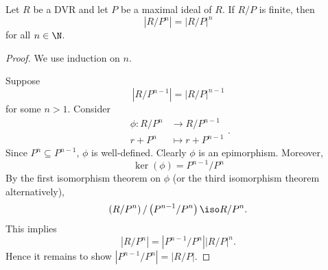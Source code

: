 \documentclass[pmath441]{subfiles}
\begin{document}
    \begin{prop}{}
        Let $R$ be a DVR and let $P$ be a maximal ideal of $R$. If $R /P$ is finite, then
        \begin{equation*}
            \left| R /P^n \right| = \left| R /P \right|^n
        \end{equation*}
        for all $n\in\N$.
    \end{prop}

    \begin{proof}
        We use induction on $n$. 

        Suppose
        \begin{equation*}
            \left| R /P^{n-1} \right| = \left| R /P \right|^{n-1}
        \end{equation*}
        for some $n>1$. Consider
        \begin{equation*}
            \begin{aligned}
                \phi:R /P^{n}&\to R /P^{n-1} \\
                r+P^{n} &\mapsto r+P^{n-1}
            \end{aligned} .
        \end{equation*}
        Since $P^{n}\subseteq P^{n-1}$, $\phi$ is well-defined. Clearly $\phi$ is an epimorphism. Moreover,
        \begin{equation*}
            \ker\left( \phi \right) = P^{n-1} /P^n
        \end{equation*}
        By the first isomorphism theorem on $\phi$ (or the third isomorphism theorem alternatively),
        \begin{equation*}
            \left( R /P^n \right) / \left( P^{n-1} /P^n \right) \iso R /P^n.
        \end{equation*}
        This implies
        \begin{equation*}
            \left| R /P^n \right| = \left| P^{n-1} /P^n \right|\left| R /P \right|^n.
        \end{equation*}
        Hence it remains to show $\left| P^{n-1} /P^n \right| = \left| R /P \right|$.


\end{proof}
\end{document}
